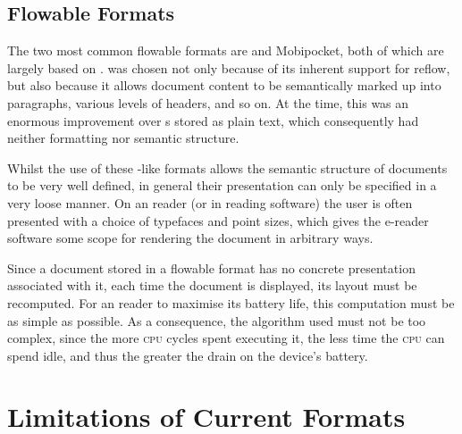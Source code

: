 

\subsection{Flowable Formats}
\label{sec:flowableformats}

The two most common flowable \ebook{} formats are \epub{} and Mobipocket, both of which are largely based on \html{}. \html{} was chosen not only because of its inherent support for reflow, but also because it allows document content to be semantically marked up into paragraphs, various levels of headers, and so on. At the time, this was an enormous improvement over \ebook{}s stored as plain text, which consequently had neither formatting nor semantic structure. 

Whilst the use of these \html{}-like formats allows the semantic structure of documents to be very well defined, in general their presentation can only be specified in a very loose manner. On an \ebook{} reader (or in \ebook{} reading software) the user is often presented with a choice of typefaces and point sizes, which gives the e-reader software some scope for rendering the document in arbitrary ways.

Since a document stored in a flowable format has no concrete presentation associated with it, each time the document is displayed, its layout must be recomputed. For an \ebook{} reader to maximise its battery life, this computation must be as simple as possible. As a consequence, the algorithm used must not be too complex, since the more \textsc{cpu} cycles spent executing it, the less time the \textsc{cpu} can spend idle, and thus the greater the drain on the device's battery.\cite{Pinkney2011}


\section{Limitations of Current Formats}

